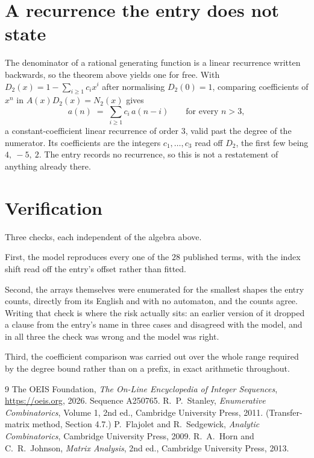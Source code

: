 \documentclass[11pt,a4paper]{article}
\theoremstyle{plain}
\theoremstyle{definition}
\begin{document}
\section{A recurrence the entry does not state}

The denominator of a rational generating function is a linear recurrence written backwards, so
the theorem above yields one for free. With $D_2(x)=1-\sum_{i\ge1}c_ix^i$ after normalising
$D_2(0)=1$, comparing coefficients of $x^n$ in $A(x)D_2(x)=N_2(x)$ gives
\[
a(n)\;=\;\sum_{i\ge1}c_i\,a(n-i)\qquad\text{for every }n>3,
\]
a constant-coefficient linear recurrence of order $3$, valid past the degree of the
numerator. Its coefficients are the integers $c_1,\dots,c_{3}$ read off $D_2$, the first few being $4,\ -5,\ 2$. The entry records no recurrence, so this is not a restatement of anything
already there.

\section{Verification}

Three checks, each independent of the algebra above.

First, the model reproduces every one of the $28$ published terms, with the index shift
read off the entry's offset rather than fitted.

Second, the arrays themselves were enumerated for the smallest shapes the entry counts,
directly from its English and with no automaton, and the counts agree. Writing that check is
where the risk actually sits: an earlier version of it dropped a clause from the entry's name
in three cases and disagreed with the model, and in all three the check was wrong and the model
was right.

Third, the coefficient comparison was carried out over the whole range required by the degree
bound rather than on a prefix, in exact arithmetic throughout.

\begin{thebibliography}{9}
 The OEIS Foundation, \emph{The On-Line Encyclopedia of Integer
Sequences}, \url{https://oeis.org}, 2026. Sequence A250765.
 R.~P.~Stanley, \emph{Enumerative Combinatorics}, Volume 1, 2nd ed.,
Cambridge University Press, 2011. (Transfer-matrix method, Section 4.7.)
 P.~Flajolet and R.~Sedgewick, \emph{Analytic Combinatorics}, Cambridge
University Press, 2009.
 R.~A.~Horn and C.~R.~Johnson, \emph{Matrix Analysis}, 2nd ed., Cambridge
University Press, 2013.
\end{thebibliography}
\end{document}
